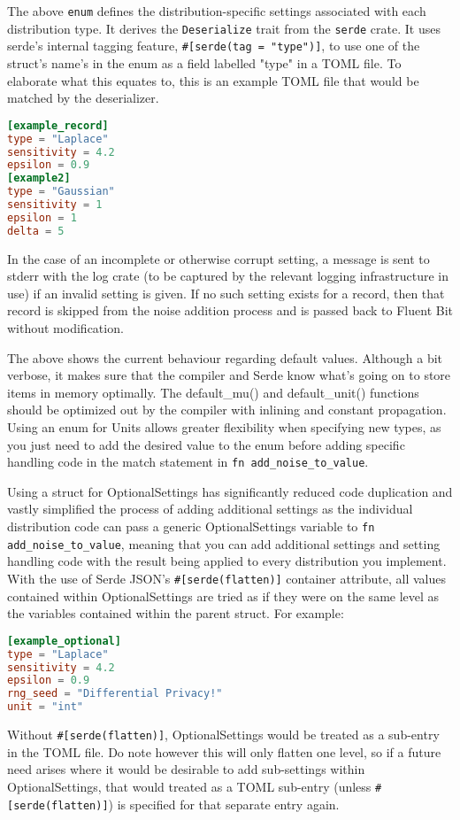 The above \texttt{enum} defines the distribution-specific settings associated with each distribution type. It derives the \texttt{Deserialize} trait from the \texttt{serde} crate. It uses serde's internal tagging feature, \texttt{\#[serde(tag = "type")]}, to use one of the struct's name's in the enum as a field labelled "type" in a TOML file. To elaborate what this equates to, this is an example TOML file that would be matched by the deserializer.
\begin{lstlisting}[language=toml, caption={Enum from rv::dist::distribution}]
[example_record]
type = "Laplace"
sensitivity = 4.2
epsilon = 0.9
[example2]
type = "Gaussian"
sensitivity = 1
epsilon = 1
delta = 5
\end{lstlisting}
In the case of an incomplete or otherwise corrupt setting, a message is sent to stderr with the log crate (to be captured by the relevant logging infrastructure in use) if an invalid setting is given. If no such setting exists for a record, then that record is skipped from the noise addition process and is passed back to Fluent Bit without modification. 



The above shows the current behaviour regarding default values. Although a bit verbose, it makes sure that the compiler and Serde know what's going on to store items in memory optimally. The default\_mu() and default\_unit() functions should be optimized out by the compiler with inlining and constant propagation. Using an enum for Units allows greater flexibility when specifying new types, as you just need to add the desired value to the enum before adding specific handling code in the match statement in \texttt{fn add\_noise\_to\_value}.

Using a struct for OptionalSettings has significantly reduced code duplication and vastly simplified the process of adding additional settings as the individual distribution code can pass a generic OptionalSettings variable to \texttt{fn add\_noise\_to\_value}, meaning that you can add additional settings and setting handling code with the result being applied to every distribution you implement. With the use of Serde JSON's \texttt{\#[serde(flatten)]} container attribute, all values contained within OptionalSettings are tried as if they were on the same level as the variables contained within the parent struct. For example:

\begin{lstlisting}[language=TOML, caption={Test}]
[example_optional]
type = "Laplace"
sensitivity = 4.2
epsilon = 0.9
rng_seed = "Differential Privacy!"
unit = "int"
\end{lstlisting}
Without \texttt{\#[serde(flatten)]}, OptionalSettings would be treated as a sub-entry in the TOML file. Do note however this will only flatten one level, so if a future need arises where it would be desirable to add sub-settings within OptionalSettings, that would treated as a TOML sub-entry (unless \texttt{\#[serde(flatten)]}) is specified for that separate entry again.


